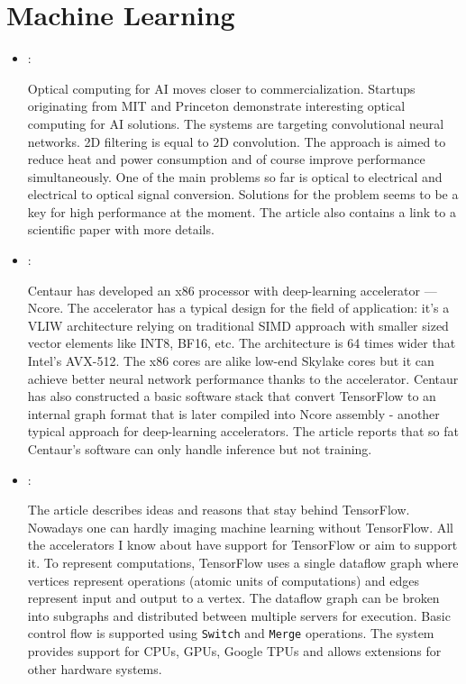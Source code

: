 \section*{Machine Learning}
\begin{itemize}
    \item \cite{Wheeler:Optical-AI:2019}:

    Optical computing for AI moves closer to commercialization. Startups originating from MIT and Princeton demonstrate interesting optical computing for AI solutions. The systems are targeting convolutional neural networks. 2D filtering is equal to 2D convolution. The approach is aimed to reduce heat and power consumption and of course improve performance simultaneously. One of the main problems so far is optical to electrical and electrical to optical signal conversion. Solutions for the problem seems to be a key for high performance at the moment. The article also contains a link to a scientific paper with more details.

    \item \cite{Gwennap:Centaur-AI:2019}:

    Centaur has developed an x86 processor with deep-learning accelerator --- Ncore. The accelerator has a typical design for the field of application: it's a VLIW architecture relying on traditional SIMD approach with smaller sized vector elements like INT8, BF16, etc. The architecture is 64 times wider that Intel's AVX-512. The x86 cores are alike low-end Skylake cores but it can achieve better neural network performance thanks to the accelerator. Centaur has also constructed a basic software stack that convert TensorFlow to an internal graph format that is later compiled into Ncore assembly - another typical approach for deep-learning accelerators. The article reports that so fat Centaur's software can only handle inference but not training.

    \item \cite{Abadi:TensorFlow:2016}:

    The article describes ideas and reasons that stay behind TensorFlow. Nowadays one can hardly imaging machine learning without TensorFlow. All the accelerators I know about have support for TensorFlow or aim to support it. To represent computations, TensorFlow uses a single dataflow graph where vertices represent operations (atomic units of computations) and edges represent input and output to a vertex. The dataflow graph can be broken into subgraphs and distributed between multiple servers for execution. Basic control flow is supported using \texttt{Switch} and \texttt{Merge} operations. The system provides support for CPUs, GPUs, Google TPUs and allows extensions for other hardware systems.


\end{itemize}
